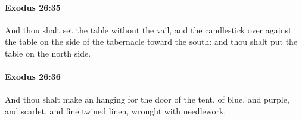 		\paragraph{Exodus 26:35} %
			\label{EXODUS-26-35}

			And thou shalt set the table without the vail, and the candlestick over against the table on the side of the tabernacle toward the south: and thou shalt put the table on the north side.


		\paragraph{Exodus 26:36} %
			\label{EXODUS-26-36}

			And thou shalt make an hanging for the door of the tent, of blue, and purple, and scarlet, and fine twined linen, wrought with needlework.


